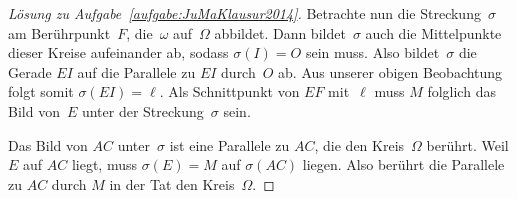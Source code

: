 \begin{proof}[Lösung zu Aufgabe~\ref{aufgabe:JuMaKlausur2014}]
	Betrachte nun die Streckung~$\sigma$ am Berührpunkt~$F$, die~$\omega$ auf~$\Omega$ abbildet. Dann bildet~$\sigma$ auch die Mittelpunkte dieser Kreise aufeinander ab, sodass $\sigma(I)=O$ sein muss. Also bildet~$\sigma$ die Gerade $EI$ auf die Parallele zu $EI$ durch~$O$ ab. Aus unserer obigen Beobachtung folgt somit $\sigma(EI)=\ell$. Als Schnittpunkt von $EF$ mit~$\ell$ muss $M$ folglich das Bild von~$E$ unter der Streckung~$\sigma$ sein.
	
	Das Bild von $AC$ unter~$\sigma$ ist eine Parallele zu $AC$, die den Kreis~$\Omega$ berührt. Weil $E$ auf $AC$ liegt, muss $\sigma(E)=M$ auf $\sigma(AC)$ liegen. Also berührt die Parallele zu $AC$ durch $M$ in der Tat den Kreis~$\Omega$.
\end{proof}

